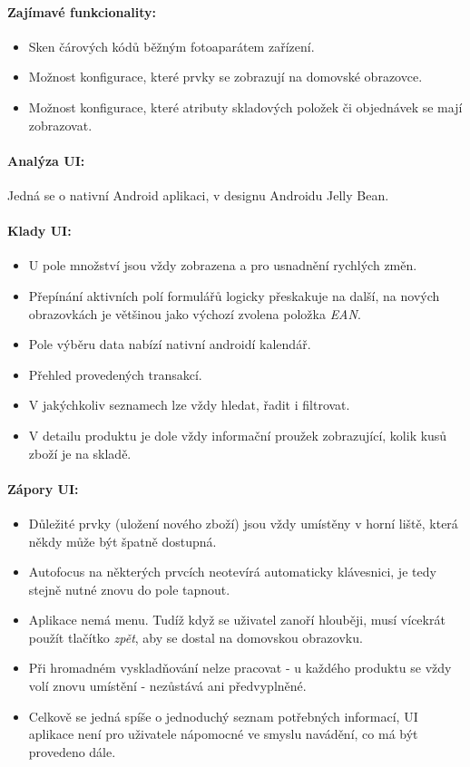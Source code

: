 \paragraph{Zajímavé funkcionality:}
\begin{itemize}
	\item Sken čárových kódů běžným fotoaparátem zařízení.
	\item Možnost konfigurace, které prvky se zobrazují na domovské obrazovce.
	\item Možnost konfigurace, které atributy skladových položek či objednávek se mají zobrazovat.
\end{itemize}

\paragraph{Analýza UI:} Jedná se o nativní Android aplikaci, v designu Androidu Jelly Bean. 

\paragraph{Klady UI:}
\begin{itemize}
	\item U pole množství jsou vždy zobrazena \uv{+} a \uv{-} pro usnadnění rychlých změn.
	\item Přepínání aktivních polí formulářů logicky přeskakuje na další, na nových obrazovkách je většinou jako výchozí zvolena položka \emph{EAN}.
	\item Pole výběru data nabízí nativní androidí kalendář.
	\item Přehled provedených transakcí.
	\item V jakýchkoliv seznamech lze vždy hledat, řadit i filtrovat.
	\item V detailu produktu je dole vždy informační proužek zobrazující, kolik kusů zboží je na skladě.
\end{itemize}

\paragraph{Zápory UI:}
\begin{itemize}
	\item Důležité prvky (uložení nového zboží) jsou vždy umístěny v horní liště, která někdy může být špatně dostupná.
	\item Autofocus na některých prvcích neotevírá automaticky klávesnici, je tedy stejně nutné znovu do pole tapnout.
	\item Aplikace nemá menu. Tudíž když se uživatel zanoří hlouběji, musí vícekrát použít tlačítko \emph{zpět}, aby se dostal na domovskou obrazovku.
	\item Při hromadném vyskladňování nelze pracovat  - u každého produktu se vždy volí znovu umístění - nezůstává ani předvyplněné.
	\item Celkově se jedná spíše o jednoduchý seznam potřebných informací, UI aplikace není pro uživatele nápomocné ve smyslu navádění, co má být provedeno dále.
\end{itemize}

